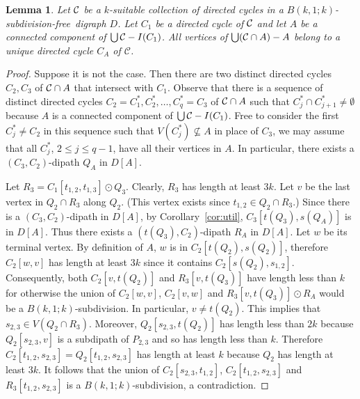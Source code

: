 \documentclass[utf8,10pt]{article}
\theoremstyle{plain}
\newtheorem{lemma}[theorem]{Lemma}
\theoremstyle{definition}
\theoremstyle{remark}
\newcommand{\FH}[1]{{\color{red}{\bf Fred:} #1}}
\newcommand{\free}{subdivision-free}
\begin{document}
\begin{lemma}\label{lem:A}
Let ${\cal C}$ be a $k$-suitable collection of directed cycles in a $B(k,1;k)$-\free\ digraph $D$.
Let $C_1$ be a directed cycle of ${\cal C}$ and let $A$ be a connected component of $\bigcup{\cal C} - I(C_1)$.
All vertices of $\bigcup({\cal C}\cap A)  - A$ belong to a unique directed cycle $C_A$ of $\mathcal{C}$.
\end{lemma}


\begin{proof}
Suppose it is not the case. Then there are two distinct directed cycles $C_2, C_3$ of ${\cal C}\cap A$ that intersect with $C_1$.
Observe that there is a sequence of distinct directed cycles $C_2=C^*_1, C^*_2, \dots , C^*_q=C_3$ of ${\cal C}\cap A$ such that $C^*_j\cap C^*_{j+1}\neq \emptyset$ because $A$ is a connected component of $\bigcup{\cal C} - I(C_1)$.
Free to consider the first $C^*_j \neq C_2$ in this sequence such that $V(C^*_j)\not\subseteq A$ in place of $C_3$, we may assume
 that all $C^*_j$, $2\leq j\leq q-1$, have all their vertices in $A$.
 In particular, there exists a  $(C_3,C_2)$-dipath $Q_A$ in $D[A]$.

Let $R_3=C_1[t_{1,2},t_{1,3}]\odot Q_3$. Clearly, $R_3$ has length at least $3k$.
Let $v$ be the last vertex in $Q_2\cap R_3$ along $Q_2$. (This vertex exists since $t_{1,2}\in Q_2\cap R_3$.) Since there is a $(C_3,C_2)$-dipath in $D[A]$, by Corollary~\ref{cor:util}, $C_3[t(Q_3), s(Q_A)]$ is in $D[A]$. Thus  there exists a $(t(Q_3), C_2)$-dipath $R_A$ in $D[A]$.  Let $w$ be its terminal vertex. By definition of $A$, $w$ is in $C_2[t(Q_2), s(Q_2)]$, therefore $C_2[w,v]$ has length at least $3k$ since it contains $C_2[s(Q_2), s_{1,2}]$. Consequently, both $C_2[v,t(Q_2)]$ and $R_3[v,t(Q_3)]$ have length less than $k$ for otherwise the union of $C_2[w,v]$, $C_2[v,w]$ and $R_3[v,t(Q_3)]\odot R_A$ would be a $B(k,1;k)$-subdivision.
In particular, $v\neq t(Q_2)$. This implies that $s_{2,3}\in V(Q_2\cap R_3)$.
Moreover, $Q_2[s_{2,3}, t(Q_2)]$ has length less than $2k$ because $Q_2[s_{2,3},v]$ is a subdipath of $P_{2,3}$ and so has length less than $k$.
Therefore $C_2[t_{1,2},s_{2,3}]=Q_2[t_{1,2},s_{2,3}]$ has length at least $k$ because $Q_2$ has length at least $3k$.
It follows that the union of $C_2[s_{2,3},t_{1,2}]$,  $C_2[t_{1,2},s_{2,3}]$ and  $R_3[t_{1,2},s_{2,3}]$ is a $B(k,1;k)$-subdivision, a contradiction.
\end{proof}
\end{document}
